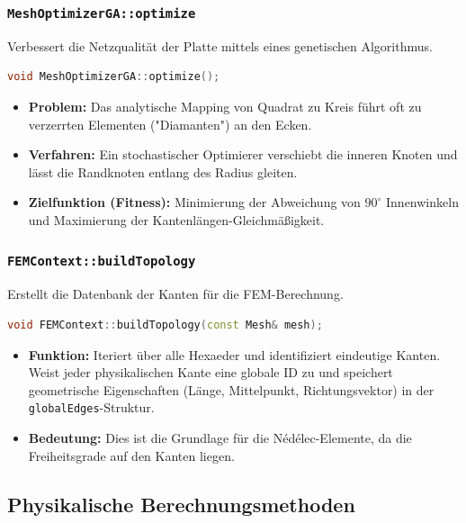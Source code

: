 \documentclass[a4paper,12pt]{article}
\begin{document}
\subsubsection{\texttt{MeshOptimizerGA::optimize}}
Verbessert die Netzqualität der Platte mittels eines genetischen Algorithmus.
\begin{lstlisting}[language=C++]
void MeshOptimizerGA::optimize();
\end{lstlisting}
\begin{itemize}
    \item \textbf{Problem:} Das analytische Mapping von Quadrat zu Kreis führt oft zu verzerrten Elementen ("Diamanten") an den Ecken.
    \item \textbf{Verfahren:} Ein stochastischer Optimierer verschiebt die inneren Knoten und lässt die Randknoten entlang des Radius gleiten.
    \item \textbf{Zielfunktion (Fitness):} Minimierung der Abweichung von $90^\circ$ Innenwinkeln und Maximierung der Kantenlängen-Gleichmäßigkeit.
\end{itemize}

\subsubsection{\texttt{FEMContext::buildTopology}}
Erstellt die Datenbank der Kanten für die FEM-Berechnung.
\begin{lstlisting}[language=C++]
void FEMContext::buildTopology(const Mesh& mesh);
\end{lstlisting}
\begin{itemize}
    \item \textbf{Funktion:} Iteriert über alle Hexaeder und identifiziert eindeutige Kanten. Weist jeder physikalischen Kante eine globale ID zu und speichert geometrische Eigenschaften (Länge, Mittelpunkt, Richtungsvektor) in der \texttt{globalEdges}-Struktur.
    \item \textbf{Bedeutung:} Dies ist die Grundlage für die Nédélec-Elemente, da die Freiheitsgrade auf den Kanten liegen.
\end{itemize}

\subsection{Physikalische Berechnungsmethoden}
\end{document}
